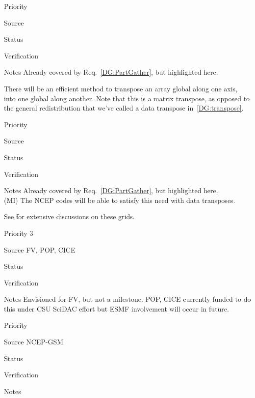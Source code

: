 \begin{reqlist}
\item[Priority]
\item[Source]
\item[Status]
\item[Verification]
\item[Notes] Already covered by Req.~\ref{DG:PartGather}, but
  highlighted here.
\end{reqlist}


There will be an efficient method to transpose an array global along
one axis, into one global along another. Note that this is a matrix
transpose, as opposed to the general redistribution that we've called
a data transpose in~\ref{DG:transpose}.

\begin{reqlist}
\item[Priority]
\item[Source]
\item[Status]
\item[Verification]
\item[Notes] Already covered by Req.~\ref{DG:PartGather}, but
  highlighted here.
  \\ (MI) The NCEP codes will be able to satisfy this need with data transposes.
\end{reqlist}



See \cite{art:heikes+:geodesic,art:majewski+:gme} for extensive
discussions on these grids.

\begin{reqlist}
\item[Priority] 3
\item[Source] FV, POP, CICE
\item[Status]
\item[Verification]
\item[Notes] Envisioned for FV, but not a milestone.  POP, CICE
             currently funded to do this under CSU SciDAC effort
             but ESMF involvement will occur in future.
\end{reqlist}


\begin{reqlist}
\item[Priority]
\item[Source] NCEP-GSM
\item[Status]
\item[Verification]
\item[Notes]
\end{reqlist}

